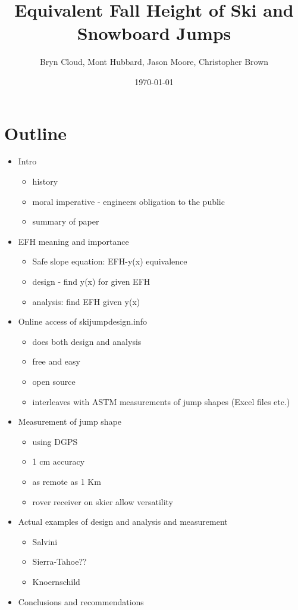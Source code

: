 \documentclass{article}
\title{Equivalent Fall Height of Ski and Snowboard Jumps}
\author{Bryn Cloud, Mont Hubbard, Jason Moore, Christopher Brown}
\date{\today}
\begin{document}
\maketitle

\section*{Outline}
%
\begin{itemize}
  \item Intro
  \begin{itemize}
	\item history
	\item moral imperative - engineers obligation to the public
	\item summary of paper
  \end{itemize}
  \item EFH meaning and importance
  \begin{itemize}
	\item Safe slope equation: EFH-y(x) equivalence
	\item design - find y(x) for given EFH
	\item analysis: find EFH given y(x)
  \end{itemize}
  \item Online access of skijumpdesign.info
  \begin{itemize}
	\item does both design and analysis
	\item free and easy
	\item open source
	\item interleaves with ASTM measurements of jump shapes (Excel files etc.)
  \end{itemize}
  \item Measurement of jump shape  
  \begin{itemize}
	\item using DGPS
	\item 1 cm accuracy
	\item as remote as 1 Km
	\item rover receiver on skier allow versatility 
  \end{itemize}
  \item Actual examples of design and analysis and measurement
  \begin{itemize}
	\item Salvini
	\item Sierra-Tahoe??
	\item Knoernschild
  \end{itemize}
  \item Conclusions and recommendations
\end{itemize}
\end{document}
